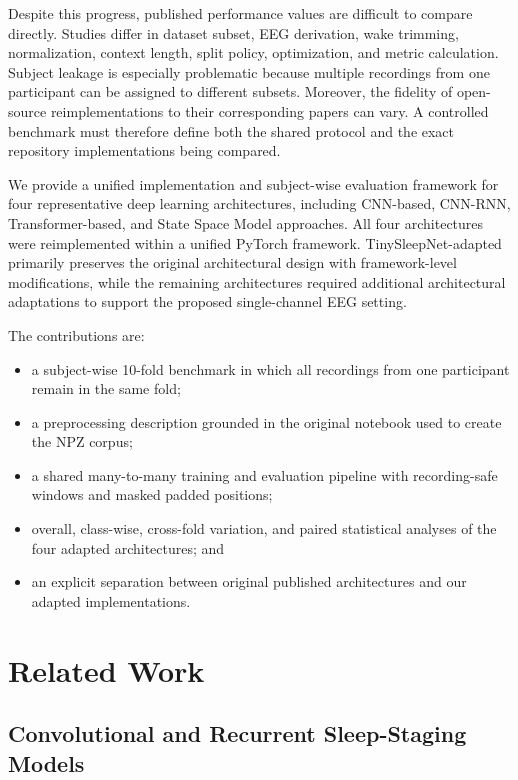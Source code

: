 \documentclass[conference]{IEEEtran}
\begin{document}
Despite this progress, published performance values are difficult to compare directly. Studies differ in dataset subset, EEG derivation, wake trimming, normalization, context length, split policy, optimization, and metric calculation. Subject leakage is especially problematic because multiple recordings from one participant can be assigned to different subsets. Moreover, the fidelity of open-source reimplementations to their corresponding papers can vary. A controlled benchmark must therefore define both the shared protocol and the exact repository implementations being compared.

We provide a unified implementation and subject-wise evaluation framework for four representative deep learning architectures, including CNN-based, CNN-RNN, Transformer-based, and State Space Model approaches. All four architectures were reimplemented within a unified PyTorch framework. TinySleepNet-adapted primarily preserves the original architectural design with framework-level modifications, while the remaining architectures required additional architectural adaptations to support the proposed single-channel EEG setting.

The contributions are:
\begin{itemize}
    \item a subject-wise 10-fold benchmark in which all recordings from one participant remain in the same fold;
    \item a preprocessing description grounded in the original notebook used to create the NPZ corpus;
    \item a shared many-to-many training and evaluation pipeline with recording-safe windows and masked padded positions;
    \item overall, class-wise, cross-fold variation, and paired statistical analyses of the four adapted architectures; and
    \item an explicit separation between original published architectures and our adapted implementations.
\end{itemize}

\section{Related Work}

\subsection{Convolutional and Recurrent Sleep-Staging Models}
\end{document}
